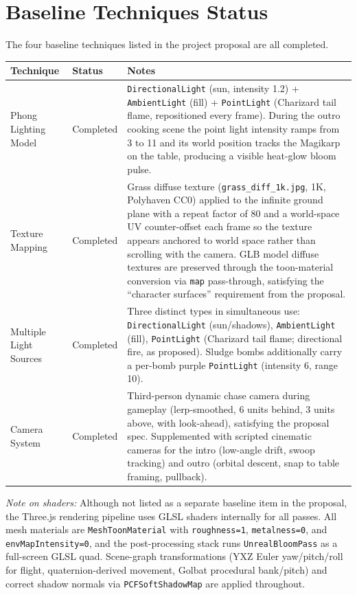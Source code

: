 \documentclass[11pt,a4paper]{article}
\begin{document}
\section{Baseline Techniques Status}

The four baseline techniques listed in the project proposal are all completed.

\begin{tabular}{@{} L{3.5cm} L{2.2cm} L{8.8cm} @{}}
\toprule
\textbf{Technique} & \textbf{Status} & \textbf{Notes} \\
\midrule
Phong Lighting Model
  & Completed
  & \texttt{DirectionalLight} (sun, intensity 1.2) + \texttt{AmbientLight}
    (fill) + \texttt{PointLight} (Charizard tail flame, repositioned every
    frame). During the outro cooking scene the point light intensity ramps from
    3 to 11 and its world position tracks the Magikarp on the table, producing a
    visible heat-glow bloom pulse. \\[4pt]
Texture Mapping
  & Completed
  & Grass diffuse texture (\texttt{grass\_diff\_1k.jpg}, 1K, Polyhaven CC0)
    applied to the infinite ground plane with a repeat factor of 80 and a
    world-space UV counter-offset each frame so the texture appears anchored to
    world space rather than scrolling with the camera. GLB model diffuse
    textures are preserved through the toon-material conversion via
    \texttt{map} pass-through, satisfying the ``character surfaces'' requirement
    from the proposal. \\[4pt]
Multiple Light Sources
  & Completed
  & Three distinct types in simultaneous use: \texttt{DirectionalLight}
    (sun/shadows), \texttt{AmbientLight} (fill), \texttt{PointLight}
    (Charizard tail flame; directional fire, as proposed). Sludge bombs
    additionally carry a per-bomb purple \texttt{PointLight}
    (intensity 6, range 10). \\[4pt]
Camera System
  & Completed
  & Third-person dynamic chase camera during gameplay (lerp-smoothed, 6 units
    behind, 3 units above, with look-ahead), satisfying the proposal spec.
    Supplemented with scripted cinematic cameras for the intro (low-angle drift,
    swoop tracking) and outro (orbital descent, snap to table framing,
    pullback). \\
\bottomrule
\end{tabular}

\medskip
\noindent\textit{Note on shaders:} Although not listed as a separate baseline
item in the proposal, the Three.js rendering pipeline uses GLSL shaders
internally for all passes. All mesh materials are \texttt{MeshToonMaterial}
with \texttt{roughness=1}, \texttt{metalness=0}, and
\texttt{envMapIntensity=0}, and the post-processing stack runs
\texttt{UnrealBloomPass} as a full-screen GLSL quad. Scene-graph transformations
(YXZ Euler yaw/pitch/roll for flight, quaternion-derived movement, Golbat
procedural bank/pitch) and correct shadow normals via
\texttt{PCFSoftShadowMap} are applied throughout.
\end{document}
